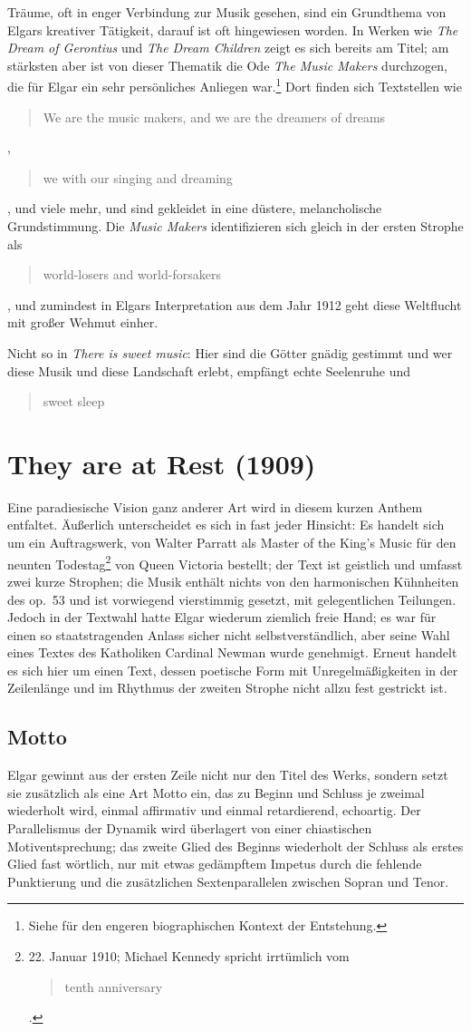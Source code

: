 \documentclass[a4paper,11pt,open=any]{scrbook}
\newcommand{\engquote}[1]{\foreignblockquote{english}{#1}}
\begin{document}
Träume, oft in enger Verbindung zur Musik gesehen, sind ein Grundthema
von Elgars kreativer Tätigkeit, darauf ist oft hingewiesen worden.  In
Werken wie \textit{The Dream of Gerontius} und \textit{The Dream Children}
zeigt es sich bereits am Titel; am stärksten aber ist von dieser Thematik
die Ode \textit{The Music Makers} durchzogen, die für Elgar ein sehr
persönliches Anliegen war.\footnote{Siehe \cite[S.~631–641,]{moore} für
den engeren biographischen Kontext der Entstehung.}  Dort finden sich
Textstellen wie \engquote{We are the music makers, and we are the dreamers
of dreams}, \engquote{we with our singing and dreaming}, und viele mehr,
und sind gekleidet in eine düstere, melancholische Grundstimmung.  Die
\textit{Music Makers} identifizieren sich gleich in der ersten Strophe als
\engquote{world-losers and world-forsakers}, und zumindest in Elgars
Interpretation aus dem Jahr 1912 geht diese Weltflucht mit großer Wehmut
einher.

Nicht so in \textit{There is sweet music}: Hier sind die Götter gnädig
gestimmt und wer diese Musik und diese Landschaft erlebt, empfängt echte
Seelenruhe und \engquote{sweet sleep}.

\section{They are at Rest \textmd{(1909)}}
Eine paradiesische Vision ganz anderer Art wird in diesem kurzen Anthem
entfaltet.  Äußerlich unterscheidet es sich in fast jeder Hinsicht: Es
handelt sich um ein Auftragswerk, von Walter Parratt als Master of the
King’s Music für den neunten Todestag\footnote{22. Januar 1910; Michael
Kennedy spricht irrtümlich vom \engquote{tenth anniversary} \parencite
[S.~114]{kennedy-life}.} von Queen Victoria bestellt; der Text ist
geistlich und umfasst zwei kurze Strophen; die Musik enthält nichts
von den harmonischen Kühnheiten des op.~53 und ist vorwiegend vierstimmig
gesetzt, mit gelegentlichen Teilungen.  Jedoch in der Textwahl hatte Elgar
wiederum ziemlich freie Hand; es war für einen so staatstragenden Anlass
sicher nicht selbstverständlich, aber seine Wahl eines Textes des Katholiken
Cardinal Newman wurde genehmigt.  Erneut handelt es sich hier um einen Text,
dessen poetische Form mit Unregelmäßigkeiten in der Zeilenlänge und im
Rhythmus der zweiten Strophe nicht allzu fest gestrickt ist.

\subsection*{Motto}
Elgar gewinnt aus der ersten Zeile nicht nur den Titel des Werks, sondern
setzt sie zusätzlich als eine Art Motto ein, das zu Beginn und Schluss je
zweimal wiederholt wird, einmal affirmativ und einmal retardierend,
echoartig.  Der Parallelismus der Dynamik wird überlagert von einer
chiastischen Motiventsprechung; das zweite Glied des Beginns wiederholt
der Schluss als erstes Glied fast wörtlich, nur mit etwas gedämpftem
Impetus durch die fehlende Punktierung und die zusätzlichen Sextenparallelen
zwischen Sopran und Tenor.
\end{document}
